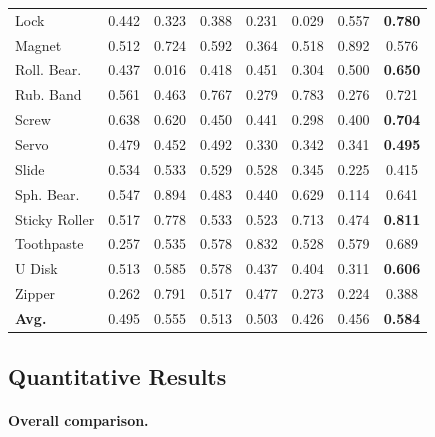\documentclass[runningheads]{llncs}
\begin{document}
\begin{table}[t]
{\begin{tabular}{@{}l cc cc cc c@{}}
{Lock} & 0.442 & 0.323 & 0.388 & 0.231 & 0.029 & \cellcolor{cellRedLight}0.557 & \cellcolor{cellRed}\textbf{0.780} \\
{Magnet} & 0.512 & \cellcolor{cellRedLight}0.724 & 0.592 & 0.364 & 0.518 & \cellcolor{cellRed}0.892 & 0.576 \\
{Roll. Bear.} & 0.437 & 0.016 & 0.418 & 0.451 & 0.304 & \cellcolor{cellRedLight}0.500 & \cellcolor{cellRed}\textbf{0.650} \\
{Rub. Band} & 0.561 & 0.463 & \cellcolor{cellRedLight}0.767 & 0.279 & \cellcolor{cellRed}0.783 & 0.276 & 0.721 \\
{Screw} & \cellcolor{cellRedLight}0.638 & 0.620 & 0.450 & 0.441 & 0.298 & 0.400 & \cellcolor{cellRed}\textbf{0.704} \\
{Servo} & 0.479 & 0.452 & \cellcolor{cellRedLight}0.492 & 0.330 & 0.342 & 0.341 & \cellcolor{cellRed}\textbf{0.495} \\
{Slide} & \cellcolor{cellRed}0.534 & \cellcolor{cellRedLight}0.533 & 0.529 & 0.528 & 0.345 & 0.225 & 0.415 \\
{Sph. Bear.} & 0.547 & \cellcolor{cellRed}0.894 & 0.483 & 0.440 & 0.629 & 0.114 & \cellcolor{cellRedLight}0.641 \\
{Sticky Roller} & 0.517 & \cellcolor{cellRedLight}0.778 & 0.533 & 0.523 & 0.713 & 0.474 & \cellcolor{cellRed}\textbf{0.811} \\
{Toothpaste} & 0.257 & 0.535 & 0.578 & \cellcolor{cellRed}0.832 & 0.528 & 0.579 & \cellcolor{cellRedLight}0.689 \\
{U Disk} & 0.513 & \cellcolor{cellRedLight}0.585 & 0.578 & 0.437 & 0.404 & 0.311 & \cellcolor{cellRed}\textbf{0.606} \\
{Zipper} & 0.262 & \cellcolor{cellRed}0.791 & \cellcolor{cellRedLight}0.517 & 0.477 & 0.273 & 0.224 & 0.388 \\
\midrule
\textbf{Avg.} & 0.495 & \cellcolor{cellRedLight}0.555 & 0.513 & 0.503 & 0.426 & 0.456 & \cellcolor{cellRed}\textbf{0.584} \\
\bottomrule
\end{tabular}}
\end{table}
\subsection{Quantitative Results}
\paragraph{\textbf{Overall comparison.}}
\end{document}

